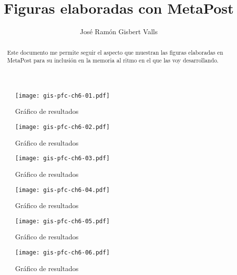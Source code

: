 \documentclass[a4paper,12pt]				{article}
\title{Figuras elaboradas con MetaPost}
\author{José Ramón Gisbert Valls}
\begin{document}
\maketitle{}

\begin{abstract}
	Este documento me permite seguir el aspecto que muestran las
	figuras elaboradas en MetaPost para su inclusión en la memoria al
	ritmo en el que las voy desarrollando.
\end{abstract}

\listoffigures

\clearpage


\begin{figure}
	\begin{center}
		\texttt{[image: gis-pfc-ch6-01.pdf]}
	\end{center}
	\caption{Gráfico de resultados}
	\label{fig:gis-pfc-ch6-01}
\end{figure}

\begin{figure}
	\begin{center}
		\texttt{[image: gis-pfc-ch6-02.pdf]}
	\end{center}
	\caption{Gráfico de resultados}
	\label{fig:gis-pfc-ch6-02}
\end{figure}

\begin{figure}
	\begin{center}
		\texttt{[image: gis-pfc-ch6-03.pdf]}
	\end{center}
	\caption{Gráfico de resultados}
	\label{fig:gis-pfc-ch6-03}
\end{figure}

\begin{figure}
	\begin{center}
		\texttt{[image: gis-pfc-ch6-04.pdf]}
	\end{center}
	\caption{Gráfico de resultados}
	\label{fig:gis-pfc-ch6-04}
\end{figure}

\begin{figure}
	\begin{center}
		\texttt{[image: gis-pfc-ch6-05.pdf]}
	\end{center}
	\caption{Gráfico de resultados}
	\label{fig:gis-pfc-ch6-05}
\end{figure}

\begin{figure}
	\begin{center}
		\texttt{[image: gis-pfc-ch6-06.pdf]}
	\end{center}
	\caption{Gráfico de resultados}
	\label{fig:gis-pfc-ch6-06}
\end{figure}
\end{document}
